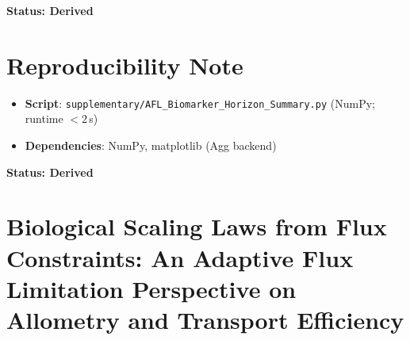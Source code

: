 \documentclass[12pt,a4paper]{article}
\begin{document}
\textbf{Status: Derived}

\section{Reproducibility Note}
\begin{itemize}
    \item \textbf{Script}: \texttt{supplementary/AFL\_Biomarker\_Horizon\_Summary.py} (NumPy; runtime $< 2$\,s)
    \item \textbf{Dependencies}: NumPy, matplotlib (Agg backend)
\end{itemize}
\textbf{Status: Derived}
\clearpage
\section*{Biological Scaling Laws from Flux Constraints: An Adaptive Flux Limitation Perspective on Allometry and Transport Efficiency}




\end{document}
